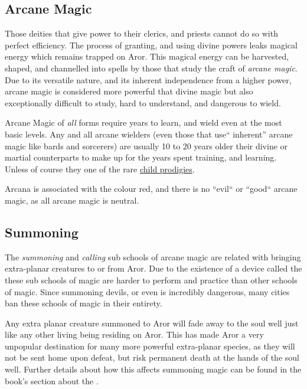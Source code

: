 \subsection{Arcane Magic}
\label{sec:Arcane Magic}

Those deities that give power to their clerics, and priests cannot do so with
perfect efficiency. The process of granting, and using divine powers leaks
magical energy which remains trapped on Aror. This magical energy can be
harvested, shaped, and channelled into spells by those that study the craft of
\emph{arcane magic}. Due to its versatile nature, and its inherent
independence from a higher power, arcane magic is considered more powerful
that divine magic but also exceptionally difficult to study, hard to
understand, and dangerous to wield.

Arcane Magic of \emph{all} forms require years to learn, and wield even at 
the most basic levels. Any and all arcane wielders (even those that use``
inherent'' arcane magic like bards and sorcerers) are usually 10 to 20 
years older their divine or martial counterparts to make up for the years 
spent training, and learning. Unless of course they one of the rare 
\hyperref[sec:Graham Balance]{child prodigies}.

Arcana is associated with the colour red, and there is no ``evil`` or ``good``
arcane magic, as all arcane magic is neutral.

\subsection{Summoning}
\label{sec:Summoning}

The \emph{summoning} and \emph{calling} sub schools of arcane magic are
related with bringing extra-planar creatures to or from Aror. Due to the
existence of a device called the  these sub schools of
magic are harder to perform and practice than other schools of magic. Since
summoning devils, or even  is incredibly dangerous, many
cities ban these schools of magic in their entirety.

Any extra planar creature summoned to Aror will fade away to the soul well
just like any other living being residing on Aror. This has made Aror a very
unpopular destination for many more powerful extra-planar species, as they
will not be sent home upon defeat, but risk permanent death at the hands of
the soul well. Further details about how this affects summoning magic can
be found in the book's section about the .

